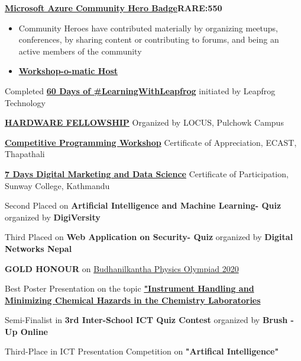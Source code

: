 \textbf{\href{}{Microsoft Azure Community Hero Badge}\hfill RARE:550}\par
\begin{itemize}
	\item Community Heroes have contributed materially by organizing meetups, conferences, by sharing content or contributing to forums, and being an active members of the community
	\item \textbf{\href{https://github.com/ompiepy/build-resume-website-MLSA}{Workshop-o-matic Host}}
\end{itemize}\par

Completed \textbf{\href{}{60 Days of \#LearningWithLeapfrog}} initiated by Leapfrog Technology\par

\textbf{\href{}{HARDWARE FELLOWSHIP}} Organized by LOCUS, Pulchowk Campus \par

\textbf{\href{}{Competitive Programming Workshop}} Certificate of Appreciation, ECAST, Thapathali \par

\textbf{\href{}{7 Days Digital Marketing and Data Science}} Certificate of Participation, Sunway College, Kathmandu \par

Second Placed on \textbf{Artificial Intelligence and Machine Learning- Quiz} organized by \textbf{DigiVersity} \par


Third Placed on \textbf{Web Application on Security- Quiz} organized by \textbf{Digital Networks Nepal} \par

\textbf{GOLD HONOUR} on \href{https://drive.google.com/file/d/17SOHDAbzEdf6Iw4_3GvGAh4eLB2bKGNL/view?usp=sharing}{Budhanilkantha Physics Olympiad 2020} \par
Best Poster Presentation on the topic \textbf{\href{https://drive.google.com/file/d/1fUisY8y-jwK5h0eehxlQyjdiZApIxCt4/view?usp=sharing}{"Instrument Handling and Minimizing Chemical Hazards in the Chemistry Laboratories}} \par
Semi-Finalist in \textbf{3rd Inter-School ICT Quiz Contest} organized by \textbf{Brush -Up Online}\par
Third-Place in ICT Presentation Competition on \textbf{"Artifical Intelligence"}\par
